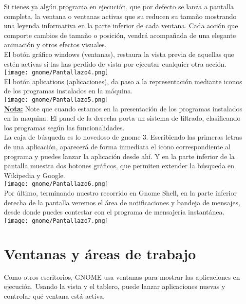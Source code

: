 \begin{itemize}
\begin{itemize}
\end{itemize}
Si tienes ya algún programa en ejecución, que por defecto se lanza a pantalla completa, la ventana o ventanas activas que su reducen su tamaño mostrando una leyenda informativa en la parte inferior de cada ventana. Cada acción que comporte cambios de tamaño o posición, vendrá acompañada de una elegante animación y otros efectos visuales.\\
El botón gráfico windows (ventanas), restaura la vista previa de aquellas que estén activas si las has perdido de vista por ejecutar cualquier otra acción.\\
\texttt{[image: gnome/Pantallazo4.png]}\\ 

El botón aplications (aplicaciones), da paso a la representación mediante iconos de los programas instalados en la máquina.\\

\texttt{[image: gnome/Pantallazo5.png]} \\
\underline{\bf Nota:} Note que cuando estamos en la presentación de los programas instalados en la maquina. El panel de la derecha porta un sistema de filtrado, clasificando los programas según las funcionalidades.\\

La caja de búsqueda es lo novedoso de gnome 3. Escribiendo las primeras letras de una aplicación, aparecerá de forma inmediata el icono correspondiente al programa y puedes lanzar la aplicación desde ahí. Y en la parte inferior de la pantalla muestra dos botones gráficos, que permiten extender la búsqueda en Wikipedia y Google.\\ 

\texttt{[image: gnome/Pantallazo6.png]}\\ 

Por último, terminando nuestro recorrido en Gnome Shell, en la parte inferior derecha de la pantalla veremos el área de notificaciones y bandeja de mensajes, desde donde puedes contestar con el programa de mensajería instantánea.\\
\texttt{[image: gnome/Pantallazo7.png]} 
\end{itemize}
\section{Ventanas y áreas de trabajo}
Como otros escritorios, GNOME usa ventanas para mostrar las aplicaciones en ejecución. Usando la vista y el tablero, puede lanzar aplicaciones nuevas y controlar qué ventana está activa.\\

